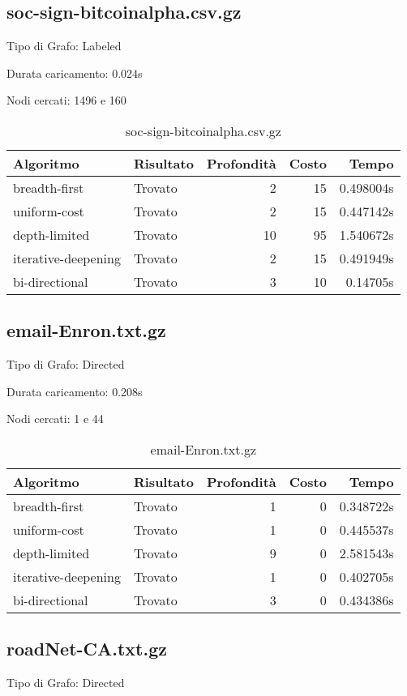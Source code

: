\subsection{soc-sign-bitcoinalpha.csv.gz}
Tipo di Grafo: Labeled

Durata caricamento: 0.024s

Nodi cercati: 1496 e 160

\begin{table}[h]
\centering
\begin{tabular}{|l|l|r|r|r|}
\hline
\textbf{Algoritmo} & \textbf{Risultato} & \textbf{Profondità} & \textbf{Costo} & \textbf{Tempo} \\
 \hline
breadth-first & Trovato & 2 & 15 & 0.498004s \\
uniform-cost & Trovato & 2 & 15 & 0.447142s \\
depth-limited & Trovato & 10 & 95 & 1.540672s \\
iterative-deepening & Trovato & 2 & 15 & 0.491949s \\
bi-directional & Trovato & 3 & 10 & 0.14705s \\
\hline
\end{tabular}
\caption{soc-sign-bitcoinalpha.csv.gz}
\end{table}
\subsection{email-Enron.txt.gz}
Tipo di Grafo: Directed

Durata caricamento: 0.208s

Nodi cercati: 1 e 44

\begin{table}[h]
\centering
\begin{tabular}{|l|l|r|r|r|}
\hline
\textbf{Algoritmo} & \textbf{Risultato} & \textbf{Profondità} & \textbf{Costo} & \textbf{Tempo} \\
 \hline
breadth-first & Trovato & 1 & 0 & 0.348722s \\
uniform-cost & Trovato & 1 & 0 & 0.445537s \\
depth-limited & Trovato & 9 & 0 & 2.581543s \\
iterative-deepening & Trovato & 1 & 0 & 0.402705s \\
bi-directional & Trovato & 3 & 0 & 0.434386s \\
\hline
\end{tabular}
\caption{email-Enron.txt.gz}
\end{table}
\subsection{roadNet-CA.txt.gz}
Tipo di Grafo: Directed

